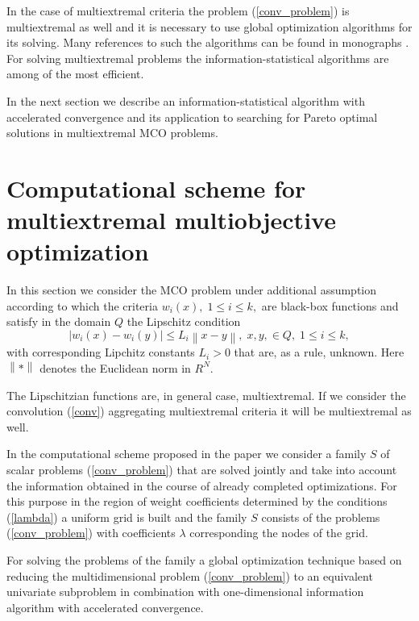 \documentclass[]{interact}
\theoremstyle{plain}%
\theoremstyle{definition}
\theoremstyle{remark}
\begin{document}
In the case of multiextremal criteria the problem (\ref{conv_problem}) is multiextremal as well and it is necessary to use global optimization algorithms for its solving. Many references to such the algorithms can be found in monographs \cite{Strongin2000,Pinter1996,Zhigljavsky2008,Sergeyev2013,PaulaviciusZilinskas2014,Sergeyev2017}. For solving multiextremal problems the information-statistical algorithms \cite{Strongin2000,Sergeyev2013} are among of the most efficient.

In the next section we describe an information-statistical algorithm with accelerated convergence and its application to searching for Pareto optimal solutions in multiextremal MCO problems.

\section{Computational scheme for multiextremal multiobjective optimization}

In this section we consider the MCO problem under additional assumption according to which the criteria $w_i(x), \; 1 \leq i \leq k,$ are black-box functions and satisfy in the domain $Q$ the Lipschitz condition
\begin{equation}\label{lip}
\left| w_i(x) - w_i(y)\right| \leq L_i \left\| x-y \right\|, \; x,y, \in Q, \; 1 \leq i \leq k,
\end{equation}
with corresponding Lipchitz constants $L_i > 0$ that are, as a rule, unknown. Here $\left\|*\right\|$   denotes the Euclidean norm in $R^N$.

The Lipschitzian functions are, in general case, multiextremal. If we consider the convolution (\ref{conv}) aggregating multiextremal criteria it will be multiextremal as well.

In the computational scheme proposed in the paper we consider a family $S$ of scalar problems (\ref{conv_problem}) that are solved jointly and take into account the information obtained in the course of already completed optimizations. For this purpose in the region of weight coefficients determined by the conditions (\ref{lambda}) a uniform grid is built and the family $S$ consists of the problems (\ref{conv_problem}) with coefficients $\lambda$ corresponding the nodes of the grid.

For solving the problems of the family a global optimization technique based on reducing the multidimensional problem (\ref{conv_problem}) to an equivalent univariate subproblem \cite{Strongin2000,Pinter1996,Zhigljavsky2008,Sergeyev2013,PaulaviciusZilinskas2014,Sergeyev2017} in combination with one-dimensional information algorithm with accelerated convergence.
\end{document}
